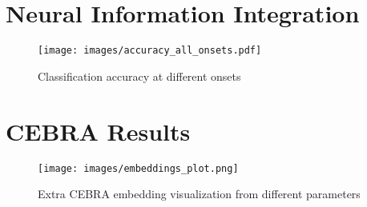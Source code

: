 \documentclass[../CLthesis.tex]{subfiles}
\begin{document}

\section{Neural Information Integration}
\label{appendix:integration}
\begin{figure}[H]
    \centering
    \texttt{[image: images/accuracy\_all\_onsets.pdf]}
    \caption{Classification accuracy at different onsets}
    \label{fig:neural_integration}
\end{figure}

\section{CEBRA Results}
\label{appendix:CEBRA}
\begin{figure}[htbp]
    \centering
    \texttt{[image: images/embeddings\_plot.png]}
    \caption{Extra CEBRA embedding visualization from different parameters}
    \label{fig:all_cebra}
\end{figure}
\end{document}
